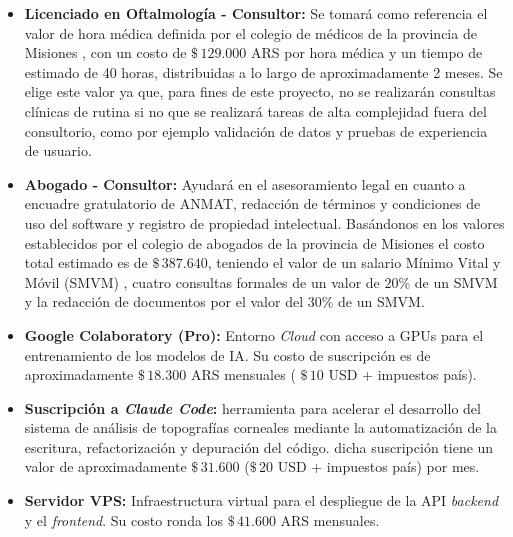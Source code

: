             \begin{itemize}
                \vspace{0.25 cm}
                \item \textbf{Licenciado en Oftalmología - Consultor:} Se tomará como referencia el valor de hora médica definida por el colegio de médicos de la provincia de Misiones , con un costo de $\$\,129.000$ ARS por hora médica y un tiempo de estimado de 40 horas, distribuidas a lo largo de aproximadamente 2 meses. Se elige este valor ya que, para fines de este proyecto, no se realizarán consultas clínicas de rutina si no que se realizará tareas de alta complejidad fuera del consultorio, como por ejemplo validación de datos y pruebas de experiencia de usuario. 
    
                \item \textbf{Abogado - Consultor:} Ayudará en el asesoramiento legal en cuanto a encuadre gratulatorio de ANMAT, redacción de términos y condiciones de uso del software y registro de propiedad intelectual. Basándonos en los valores establecidos por el colegio de abogados de la provincia de Misiones  el costo total estimado es de $\$\,387.640$, teniendo el valor de un salario Mínimo Vital y Móvil (SMVM) , cuatro consultas formales de un valor de $20\%$ de un SMVM y la redacción de documentos por el valor del $30\%$ de un SMVM.
    
                \item \textbf{Google Colaboratory (Pro):} Entorno \textit{Cloud} con acceso a GPUs para el entrenamiento de los modelos de IA. Su costo de suscripción es de aproximadamente $\$\,18.300$ ARS mensuales ( $\$\,10$ USD + impuestos país).
    
                \item \textbf{Suscripción a \textit{Claude Code}:} herramienta para acelerar el desarrollo del sistema de análisis de topografías corneales mediante la automatización de la escritura, refactorización y depuración del código. dicha suscripción tiene un valor de aproximadamente $\$\,31.600$ ($\$\,20$ USD + impuestos país) por mes.
    
                \item \textbf{Servidor VPS:} Infraestructura virtual para el despliegue de la API \textit{backend} y el \textit{frontend}. Su costo ronda los $\$\,41.600$ ARS mensuales.
            \end{itemize}

